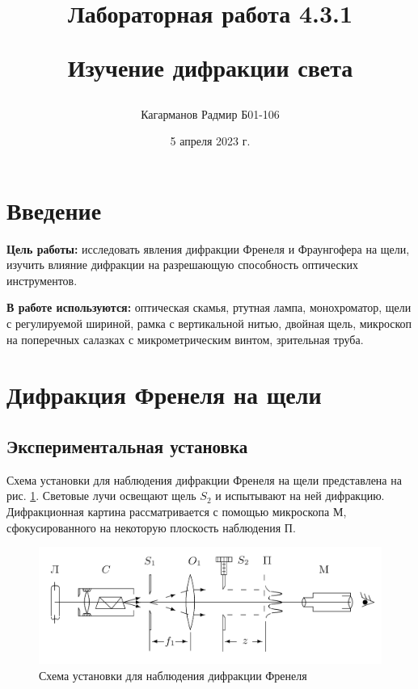 \documentclass[a4paper,12pt]{article}
\title{Лабораторная работа 4.3.1

Изучение дифракции света}
\author{Кагарманов Радмир Б01-106}
\date{5 апреля 2023 г.}
\begin{document}
\maketitle
\thispagestyle{empty}
\newpage
\setcounter{page}{1}

\section{Введение}

\textbf{Цель работы:} исследовать явления дифракции Френеля и Фраунгофера на щели, изучить влияние дифракции на разрешающую способность оптических инструментов.

\textbf{В работе используются:} оптическая скамья, ртутная лампа, монохроматор, щели с регулируемой шириной, рамка с вертикальной нитью, двойная щель, микроскоп на поперечных салазках с микрометрическим винтом, зрительная труба.

\section{Дифракция Френеля на щели}

\subsection{Экспериментальная установка}

Схема установки для наблюдения дифракции Френеля на щели представлена на рис. \ref{labA}. Световые лучи освещают щель $ S_2 $ и испытывают на ней дифракцию. Дифракционная картина рассматривается с помощью микроскопа М, сфокусированного на некоторую плоскость наблюдения П.

\begin{figure}[h!]
	\centering
	\includegraphics[width=0.8\linewidth]{a.png}
	\caption{Схема установки для наблюдения дифракции Френеля}
	\label{labA}
\end{figure}
\end{document}

